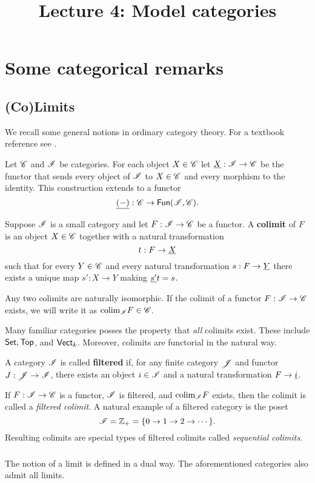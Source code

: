 \documentclass[11pt]{amsart}
\title{Lecture 4: Model categories}
\def\Fun{{\sf Fun}}
\def\colim{{\rm colim}}
\def\Set{{\sf Set}}
\def\Top{{\sf Top}}
\begin{document}
\section{Some categorical remarks}

\subsection{(Co)Limits}

We recall some general notions in ordinary category theory. 
For a textbook reference see \cite{MacLane}.

Let $\mathscr C$ and $\mathscr I$ be categories. 
For each object $X \in \mathscr C$ let $\underline{X} : \mathscr I \to \mathscr C$ be the functor that sends every object of $\mathscr I$ to $X \in \mathscr C$ and every morphism to the identity. 
This construction extends to a functor
\[
\ul{(-)} : \sC \to \Fun(\sI, \sC) .
\]

\begin{dfn}
Suppose $\mathscr I$ is a small category and let $F : \mathscr I \to \mathscr C$ be a functor. 
A {\bf colimit} of $F$ is an object $X \in \mathscr C$ together with a natural transformation
\[
t : F \to \underline{X}
\]
such that for every $Y \in \mathscr C$ and every natural transformation $s : F \to \underline{Y}$ there exists a unique map $s' : X \to Y$ making $\underline{s'} t = s$. 
\end{dfn}

Any two colimits are naturally isomorphic. 
If the colimit of a functor $F : \mathscr I \to \mathscr C$ exists, we will write it as $\colim_{\sI} F \in \sC$. 

Many familiar categories posses the property that {\em all} colimits exist. 
These include $\Set, \Top$, and ${\sf Vect}_k$.
Moreover, colimits are functorial in the natural way. 

\begin{dfn}
A category $\mathscr I$ is called {\bf filtered} if, for any finite category $\mathscr J$ and functor $J : \mathscr J \to \mathscr I$, there exists an object $i \in \mathscr I$ and a natural transformation $F \to \underline{i}$. 
\end{dfn}

If $F : \mathscr I \to \mathscr C$ is a functor, $\mathscr I$ is filtered, and $\colim_{\sI} F$ exists, then the colimit is called a {\em filtered colimit}. 
A natural example of a filtered category is the poset
\[
\mathscr I = \mathbb Z_+ = \{0 \to 1 \to 2 \to \cdots \} .
\]
Resulting colimits are special types of filtered colimits called {\em sequential colimits}. 

\subsubsection{}
The notion of a limit is defined in a dual way. 
The aforementioned categories also admit all limits. 
\end{document}
